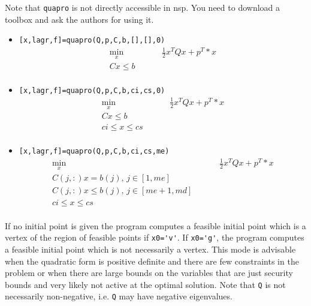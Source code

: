 \begin{mandescription}

Note that \verb!quapro! is not directly accessible in nsp. You need 
to download a toolbox and ask the authors for using it. 

\begin{itemize}
\item \verb![x,lagr,f]=quapro(Q,p,C,b,[],[],0)!
\begin{equation*}
\begin{split}
  \min_{x}& \hspace{1cm}  \frac{1}{2} x^T Q x + p^T *x \\
  C x \le b  & \\
\end{split}
\end{equation*}
\item  \verb![x,lagr,f]=quapro(Q,p,C,b,ci,cs,0)!
\begin{equation*}
\begin{split}
  \min_{x} &\hspace{1cm}  \frac{1}{2} x^T Q x + p^T *x \\
  C x \le b  & \\
  ci \le x \le cs & \\
\end{split}
\end{equation*}
\item \verb![x,lagr,f]=quapro(Q,p,C,b,ci,cs,me)!
\begin{equation*}
\begin{split}
  \min_{x} &\hspace{1cm}  \frac{1}{2} x^T Q x + p^T *x \\
  C(j,:) x = b(j) , \,  j \in [1,me] & \\
  C(j,:) x \le b(j), \, j \in [me+1,md] & \\
  ci \le x \le cs &\\
\end{split}
\end{equation*}
\end{itemize}
  If no initial point is given the
  program computes a feasible initial point
  which is a vertex of the region of feasible points if
  \verb!x0='v'!.
  If \verb!x0='g'!, the program computes a feasible initial 
  point which is not necessarily a vertex. This mode is
  advisable when the quadratic form is positive
  definite and there are  few constraints in
  the problem or when there are large bounds
  on the variables that are just security bounds and
  very likely not active at the optimal solution.
  Note that \verb!Q! is not necessarily non-negative, i.e.
  \verb!Q! may have negative eigenvalues.
\end{mandescription}
